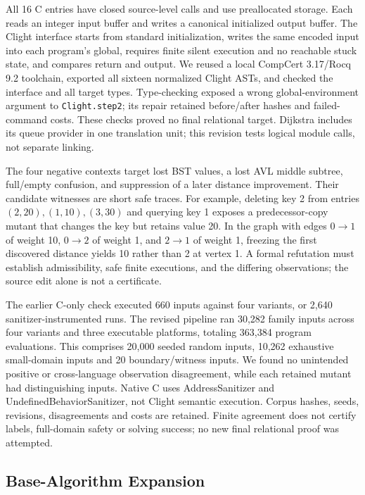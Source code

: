 \documentclass{article}
\begin{document}
All 16 C entries have closed source-level calls and use preallocated storage. Each reads an integer input buffer and writes a canonical initialized output buffer. The Clight interface starts from standard initialization, writes the same encoded input into each program's global, requires finite silent execution and no reachable stuck state, and compares return and output. We reused a local CompCert 3.17/Rocq 9.2 toolchain, exported all sixteen normalized Clight ASTs, and checked the interface and all target types. Type-checking exposed a wrong global-environment argument to \texttt{Clight.step2}; its repair retained before/after hashes and failed-command costs. These checks proved no final relational target. Dijkstra includes its queue provider in one translation unit; this revision tests logical module calls, not separate linking.

The four negative contexts target lost BST values, a lost AVL middle subtree, full/empty confusion, and suppression of a later distance improvement. Their candidate witnesses are short safe traces. For example, deleting key 2 from entries $(2,20),(1,10),(3,30)$ and querying key 1 exposes a predecessor-copy mutant that changes the key but retains value 20. In the graph with edges $0\!\to\!1$ of weight 10, $0\!\to\!2$ of weight 1, and $2\!\to\!1$ of weight 1, freezing the first discovered distance yields 10 rather than 2 at vertex 1. A formal refutation must establish admissibility, safe finite executions, and the differing observations; the source edit alone is not a certificate.

The earlier C-only check executed 660 inputs against four variants, or 2,640 sanitizer-instrumented runs. The revised pipeline ran 30,282 family inputs across four variants and three executable platforms, totaling 363,384 program evaluations. This comprises 20,000 seeded random inputs, 10,262 exhaustive small-domain inputs and 20 boundary/witness inputs. We found no unintended positive or cross-language observation disagreement, while each retained mutant had distinguishing inputs. Native C uses AddressSanitizer and UndefinedBehaviorSanitizer, not Clight semantic execution. Corpus hashes, seeds, revisions, disagreements and costs are retained. Finite agreement does not certify labels, full-domain safety or solving success; no new final relational proof was attempted.

\subsection{Base-Algorithm Expansion}
\end{document}
